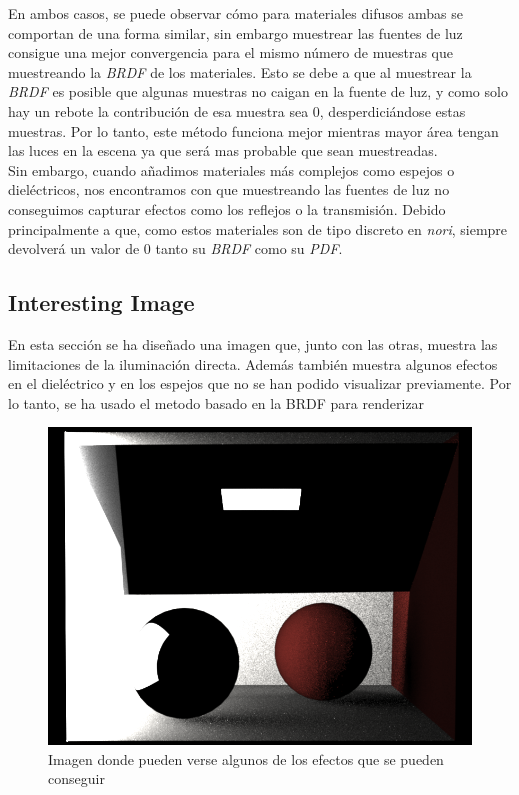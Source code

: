 \documentclass[10pt,oneside,a4paper]{article}
\begin{document}
 En ambos casos, se puede observar cómo para materiales difusos ambas se comportan de una forma similar, sin embargo muestrear las fuentes de luz consigue una mejor convergencia para el mismo número de muestras que muestreando la \textit{BRDF} de los materiales. Esto se debe a que al muestrear la \textit{BRDF} es posible que algunas muestras no caigan en la fuente de luz, y como solo hay un rebote la contribución de esa muestra sea 0, desperdiciándose estas muestras. Por lo tanto, este método funciona mejor mientras mayor área tengan las luces en la escena ya que será mas probable que sean muestreadas.\\
 
Sin embargo, cuando añadimos materiales más complejos como espejos o dieléctricos, nos encontramos con que muestreando las fuentes de luz no conseguimos capturar efectos como los reflejos o la transmisión. Debido principalmente a que, como estos materiales son de tipo discreto en \textit{nori}, siempre devolverá un valor de 0 tanto su \textit{BRDF} como su \textit{PDF}.\\
 
 \subsection{Interesting Image}
 En esta sección se ha diseñado una imagen que, junto con las otras, muestra las limitaciones de la iluminación directa. Además también muestra algunos efectos en el dieléctrico y en los espejos que no se han podido visualizar previamente. Por lo tanto, se ha usado el metodo basado en la BRDF para renderizar\\
 
 \begin{figure}[h]
\centering
\includegraphics[width=.6\linewidth]{images/cbox_interesting_512.png}
\caption{Imagen donde pueden verse algunos de los efectos que se pueden conseguir}
\label{fig:disp}
\end{figure}
 
\end{document}
